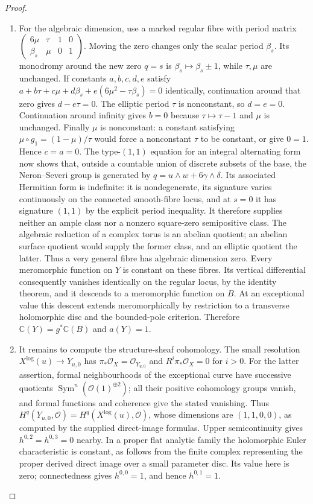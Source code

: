 \begin{proof}
\begin{enumerate}[label=\arabic*.,leftmargin=*]
\item For the algebraic dimension, use a marked regular fibre with
period matrix $\left(\begin{smallmatrix}6\mu&\tau&1&0\\
\beta_s&\mu&0&1\end{smallmatrix}\right)$.
Moving the zero changes only the scalar period $\beta_s$. Its
monodromy around the new zero $q=s$ is
$\beta_s\mapsto\beta_s\pm1$, while $\tau,\mu$ are unchanged.
If constants $a,b,c,d,e$ satisfy
$a+b\tau+c\mu+d\beta_s+e(6\mu^2-\tau\beta_s)=0$
identically, continuation around that zero gives $d-e\tau=0$.
The elliptic period $\tau$ is nonconstant, so $d=e=0$.
Continuation around infinity gives $b=0$ because
$\tau\mapsto\tau-1$ and $\mu$ is unchanged. Finally $\mu$ is
nonconstant: a constant satisfying
$\mu\circ g_1=(1-\mu)/\tau$ would force a nonconstant $\tau$ to
be constant, or give $0=1$. Hence $c=a=0$.
The type-$(1,1)$ equation for an integral alternating form now
shows that, outside a countable union of discrete subsets of the
base, the Neron--Severi group is generated by
$q=u\wedge w+6\gamma\wedge\delta$. Its associated Hermitian form
is indefinite: it is nondegenerate, its signature varies
continuously on the connected smooth-fibre locus, and at $s=0$
it has signature $(1,1)$ by the explicit period inequality.
It therefore supplies neither an ample class nor a nonzero
square-zero semipositive class. The algebraic reduction of a
complex torus is an abelian quotient; an abelian surface quotient
would supply the former class, and an elliptic quotient the latter.
Thus a very general fibre has algebraic dimension zero.
Every meromorphic function on $Y$ is constant on these fibres.
Its vertical differential consequently vanishes identically on
the regular locus, by the identity theorem, and it descends to a
meromorphic function on $B$. At an exceptional value this descent
extends meromorphically by restriction to a transverse holomorphic
disc and the bounded-pole criterion. Therefore
$\mathbb C(Y)=g^*\mathbb C(B)$ and $a(Y)=1$.

\item It remains to compute the structure-sheaf cohomology. The small
resolution $X^{\log}(u)\to Y_{u,0}$ has
$\pi_*\mathcal O_X=\mathcal O_{Y_{u,0}}$ and
$R^i\pi_*\mathcal O_X=0$ for $i>0$. For the latter assertion,
formal neighbourhoods of the exceptional curve have successive
quotients $\operatorname{Sym}^n(\mathcal O(1)^{\oplus2})$;
all their positive cohomology groups vanish, and formal functions
and coherence give the stated vanishing. Thus
$H^q(Y_{u,0},\mathcal O)=H^q(X^{\log}(u),\mathcal O)$, whose dimensions
are $(1,1,0,0)$, as computed by the supplied direct-image formulas.
Upper semicontinuity gives $h^{0,2}=h^{0,3}=0$ nearby. In a proper
flat analytic family the holomorphic Euler characteristic is
constant, as follows from the finite complex representing the
proper derived direct image over a small parameter disc. Its
value here is zero; connectedness gives $h^{0,0}=1$, and hence
$h^{0,1}=1$.
\end{enumerate}
\end{proof}


